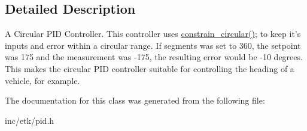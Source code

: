 \subsection{Detailed Description}
A Circular P\-I\-D Controller. This controller uses \hyperlink{namespaceetk_a77f395cb44512ab4a95d08b01b3c7f20}{constrain\-\_\-circular()}; to keep it's inputs and error within a circular range. If segments was set to 360, the setpoint was 175 and the measurement was -\/175, the resulting error would be -\/10 degrees. This makes the circular P\-I\-D controller suitable for controlling the heading of a vehicle, for example. 

The documentation for this class was generated from the following file\-:\begin{DoxyCompactItemize}
\item 
inc/etk/pid.\-h\end{DoxyCompactItemize}
